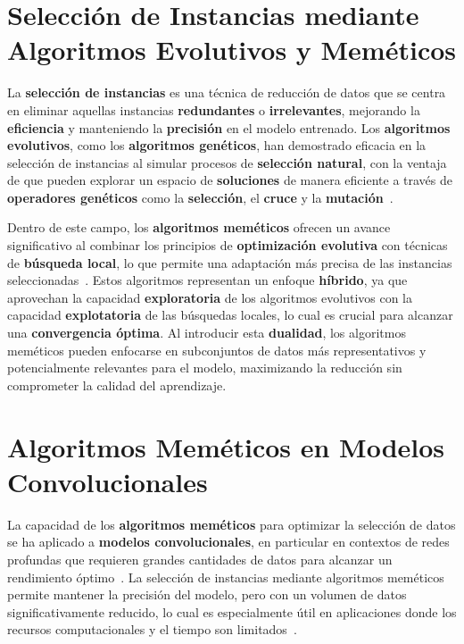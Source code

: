 \section{Selección de Instancias mediante Algoritmos Evolutivos y Meméticos}
\label{sec:seleccion-de-instancias-mediante-algoritmos-evolutivos-y-memeticos}
La \textbf{selección de instancias} es una técnica de reducción de datos que se centra en eliminar aquellas instancias
\textbf{redundantes} o \textbf{irrelevantes}, mejorando la \textbf{eficiencia} y manteniendo la \textbf{precisión} en
el modelo entrenado.
Los \textbf{algoritmos evolutivos}, como los \textbf{algoritmos genéticos}, han demostrado eficacia en la selección de
instancias al simular procesos de \textbf{selección natural}, con la ventaja de que pueden explorar un espacio de
\textbf{soluciones} de manera eficiente a través de \textbf{operadores genéticos} como la \textbf{selección}, el
\textbf{cruce} y la \textbf{mutación}~\cite{hollandAdaptationNaturalArtificial1975}.


Dentro de este campo, los \textbf{algoritmos meméticos} ofrecen un avance significativo al combinar los principios de
\textbf{optimización evolutiva} con técnicas de \textbf{búsqueda local}, lo que permite una adaptación más precisa de
las instancias seleccionadas~\cite{moscatoEvolutionSearchOptimization2000}.
Estos algoritmos representan un enfoque \textbf{híbrido}, ya que aprovechan la capacidad \textbf{exploratoria} de los
algoritmos evolutivos con la capacidad \textbf{explotatoria} de las búsquedas locales, lo cual es crucial para alcanzar
una \textbf{convergencia óptima}.
Al introducir esta \textbf{dualidad}, los algoritmos meméticos pueden enfocarse en subconjuntos de datos más
representativos y potencialmente relevantes para el modelo, maximizando la reducción sin comprometer la calidad del
aprendizaje.


\section{Algoritmos Meméticos en Modelos Convolucionales}\label{sec:algoritmos-memeticos-en-modelos-convolucionales}
La capacidad de los \textbf{algoritmos meméticos} para optimizar la selección de datos se ha aplicado a
\textbf{modelos convolucionales}, en particular en contextos de redes profundas que requieren grandes cantidades de
datos para alcanzar un rendimiento óptimo~\cite{neriHandbookMemeticAlgorithms2012}.
La selección de instancias mediante algoritmos meméticos permite mantener la precisión del modelo, pero con un volumen
de datos significativamente reducido, lo cual es especialmente útil en aplicaciones donde los recursos computacionales
y el tiempo son
limitados~\cite{dongMemeticAlgorithmEvolving2020}.



